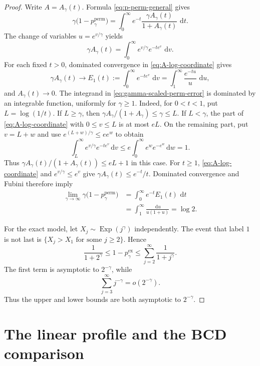 \documentclass[11pt]{article}
\numberwithin{equation}{section}
\theoremstyle{definition}
\theoremstyle{remark}
\newcommand{\Exp}{\operatorname{Exp}}
\newcommand{\dd}{\,\mathrm d}
\begin{document}
\begin{proof}
Write $A=A_\gamma(t)$.  Formula \eqref{eq:p-perm-general} gives
\begin{equation}
  \gamma\bigl(1-p_\gamma^{\mathrm{perm}}\bigr)
  =\int_0^\infty e^{-t}
    \frac{\gamma A_\gamma(t)}{1+A_\gamma(t)}\,\dd t.
  \label{eq:gamma-scaled-perm-error}
\end{equation}
The change of variables $u=e^{v/\gamma}$ yields
\begin{equation}
  \gamma A_\gamma(t)
  =\int_0^\infty e^{v/\gamma}e^{-te^v}\,\dd v.
  \label{eq:A-log-coordinate}
\end{equation}
For each fixed $t>0$, dominated convergence in \eqref{eq:A-log-coordinate}
gives
\[
  \gamma A_\gamma(t)\longrightarrow
  E_1(t):=\int_0^\infty e^{-te^v}\,\dd v
  =\int_1^\infty\frac{e^{-tu}}{u}\,\dd u,
\]
and $A_\gamma(t)\to0$.  The integrand in
\eqref{eq:gamma-scaled-perm-error} is dominated by an integrable function,
uniformly for $\gamma\geq1$.  Indeed, for $0<t<1$, put
$L=\log(1/t)$.  If $L\geq\gamma$, then
$\gamma A_\gamma/(1+A_\gamma)\leq\gamma\leq L$.  If $L<\gamma$, the
part of \eqref{eq:A-log-coordinate} with $0\leq v\leq L$ is at most $eL$.
On the remaining part, put $v=L+w$ and use
$e^{(L+w)/\gamma}\leq e e^w$ to obtain
\[
  \int_L^\infty e^{v/\gamma}e^{-te^v}\dd v
  \leq e\int_0^\infty e^w e^{-e^w}\dd w=1.
\]
Thus $\gamma A_\gamma(t)/(1+A_\gamma(t))\leq eL+1$ in this case.
For $t\geq1$, \eqref{eq:A-log-coordinate} and
$e^{v/\gamma}\leq e^v$ give
$\gamma A_\gamma(t)\leq e^{-t}/t$.  Dominated convergence and Fubini
therefore imply
\begin{align*}
  \lim_{\gamma\to\infty}
  \gamma\bigl(1-p_\gamma^{\mathrm{perm}}\bigr)
  &=\int_0^\infty e^{-t}E_1(t)\,\dd t\\
  &=\int_1^\infty\frac{\dd u}{u(1+u)}
  =\log2.
\end{align*}

For the exact model, let $X_j\sim\Exp(j^\gamma)$ independently.  The event
that label $1$ is not last is
$\{X_j>X_1\text{ for some }j\geq2\}$.  Hence
\[
  \frac1{1+2^\gamma}
  \leq1-p_\gamma^{\mathrm{ex}}
  \leq\sum_{j=2}^\infty\frac1{1+j^\gamma}.
\]
The first term is asymptotic to $2^{-\gamma}$, while
\[
  \sum_{j=3}^\infty j^{-\gamma}=o(2^{-\gamma}).
\]
Thus the upper and lower bounds are both asymptotic to $2^{-\gamma}$.
\end{proof}

\section{The linear profile and the BCD comparison}
\label{sec:linear}
\end{document}
